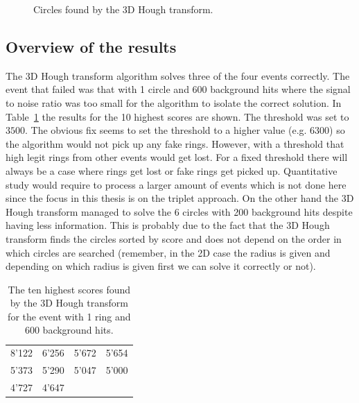 \documentclass[11pt]{scrreprt}
\begin{document}
\begin{figure}[htp]
        \centering

        \caption[Circles found by the 3D Hough transform]{Circles found by the 3D Hough transform.\label{fig:3D_HT_results}}
\end{figure}


\subsection{Overview of the results} %
\label{ssub:3d_overview_of_the_results}

The 3D Hough transform algorithm solves three of the four events correctly. The event that failed was that with 1 circle and 600 background hits where the signal to noise ratio was too small for the algorithm to isolate the correct solution. In Table~\ref{tab:3d_10_high_scores} the results for the 10 highest scores are shown. The threshold was set to $3500$. The obvious fix seems to set the threshold to a higher value (e.g. $6300$) so the algorithm would not pick up any fake rings. However, with a threshold that high legit rings from other events would get lost. For a fixed threshold there will always be a case where rings get lost or fake rings get picked up. Quantitative study would require to process a larger amount of events which is not done here since the focus in this thesis is on the triplet approach. On the other hand the 3D Hough transform managed to solve the 6 circles with 200 background hits despite having less information. This is probably due to the fact that the 3D Hough transform finds the circles sorted by score and does not depend on the order in which circles are searched (remember, in the 2D case the radius is given and depending on which radius is given first we can solve it correctly or not).

\begin{table}[htp]
\centering
\caption[Circle scores for 1 ring 600 background hits]{The ten highest scores found by the 3D Hough transform for the event with 1 ring and 600 background hits.}
\label{tab:3d_10_high_scores}
\begin{tabular}{c|c|c|c}
\toprule
8'122 & 6'256 & 5'672 & 5'654 \\
5'373 & 5'290 & 5'047 & 5'000 \\
4'727 & 4'647 &  &  \\
\bottomrule
\end{tabular}
\end{table}
\end{document}
